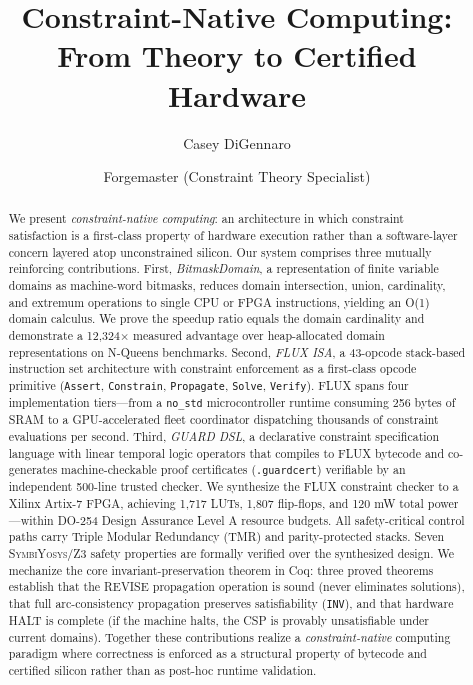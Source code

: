 \documentclass[sigplan,10pt,review]{acmart}
\begin{document}
\title{Constraint-Native Computing: From Theory to Certified Hardware}

\author{Casey DiGennaro}

\author{Forgemaster (Constraint Theory Specialist)}

\begin{abstract}
We present \emph{constraint-native computing}: an architecture in which
constraint satisfaction is a first-class property of hardware execution rather
than a software-layer concern layered atop unconstrained silicon.
Our system comprises three mutually reinforcing contributions.
First, \emph{BitmaskDomain}, a representation of finite variable domains as
machine-word bitmasks, reduces domain intersection, union, cardinality, and
extremum operations to single CPU or FPGA instructions, yielding an O(1)
domain calculus. We prove the speedup ratio equals the domain cardinality
and demonstrate a 12,324$\times$ measured advantage over heap-allocated
domain representations on N-Queens benchmarks.
Second, \emph{FLUX ISA}, a 43-opcode stack-based instruction set architecture
with constraint enforcement as a first-class opcode primitive (\texttt{Assert},
\texttt{Constrain}, \texttt{Propagate}, \texttt{Solve}, \texttt{Verify}).
FLUX spans four implementation tiers---from a \texttt{no\_std} microcontroller
runtime consuming 256 bytes of SRAM to a GPU-accelerated fleet coordinator
dispatching thousands of constraint evaluations per second.
Third, \emph{GUARD DSL}, a declarative constraint specification language with
linear temporal logic operators that compiles to FLUX bytecode and
co-generates machine-checkable proof certificates (\texttt{.guardcert})
verifiable by an independent 500-line trusted checker.
We synthesize the FLUX constraint checker to a Xilinx Artix-7 FPGA,
achieving 1,717 LUTs, 1,807 flip-flops, and 120 mW total power---within
DO-254 Design Assurance Level A resource budgets.
All safety-critical control paths carry Triple Modular Redundancy (TMR) and
parity-protected stacks. Seven \textsc{SymbiYosys}/Z3 safety properties are
formally verified over the synthesized design.
We mechanize the core invariant-preservation theorem in Coq: three proved
theorems establish that the REVISE propagation operation is sound (never
eliminates solutions), that full arc-consistency propagation preserves
satisfiability (\texttt{INV}), and that hardware HALT is complete (if the
machine halts, the CSP is provably unsatisfiable under current domains).
Together these contributions realize a \emph{constraint-native} computing
paradigm where correctness is enforced as a structural property of bytecode
and certified silicon rather than as post-hoc runtime validation.
\end{abstract}
\end{document}
